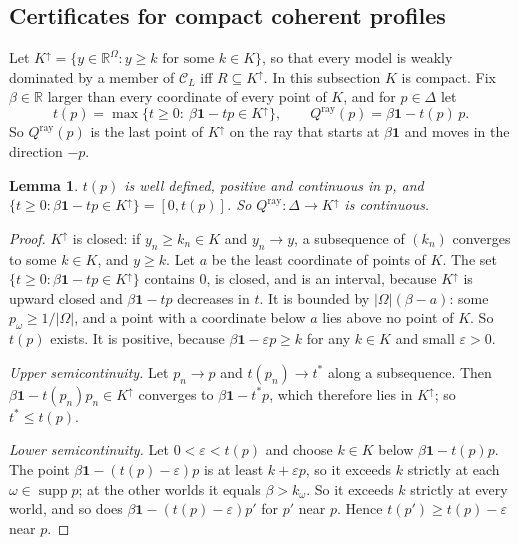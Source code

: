 \documentclass[11pt]{article}
\newtheorem{lemma}[theorem]{Lemma}
\theoremstyle{definition}
\theoremstyle{remark}
\newcommand{\R}{\mathbb R}
\newcommand{\C}{\mathcal C}
\newcommand{\one}{\mathbf 1}
\newcommand{\supp}{\operatorname{supp}}
\begin{document}
\subsection{Certificates for compact coherent profiles}\label{sec:necessary}
Let $K^\uparrow=\{y\in\R^\Omega:y\ge k\text{ for some }k\in K\}$, so that every model is weakly dominated by a member of $\C_L$ iff $R\subseteq K^\uparrow$. In this subsection $K$ is compact. Fix $\beta\in\R$ larger than every coordinate of every point of $K$, and for $p\in\Delta$ let
\[
 t(p)=\max\{t\ge0:\ \beta\one-tp\in K^\uparrow\},\qquad Q^{\mathrm{ray}}(p)=\beta\one-t(p)\,p.
\]
So $Q^{\mathrm{ray}}(p)$ is the last point of $K^\uparrow$ on the ray that starts at $\beta\one$ and moves in the direction $-p$.

\begin{lemma}\label{lem:ray}
$t(p)$ is well defined, positive and continuous in $p$, and $\{t\ge0:\beta\one-tp\in K^\uparrow\}=[0,t(p)]$. So $Q^{\mathrm{ray}}:\Delta\to K^\uparrow$ is continuous.
\end{lemma}
\begin{proof}
$K^\uparrow$ is closed: if $y_n\ge k_n\in K$ and $y_n\to y$, a subsequence of $(k_n)$ converges to some $k\in K$, and $y\ge k$. Let $a$ be the least coordinate of points of $K$. The set $\{t\ge0:\beta\one-tp\in K^\uparrow\}$ contains $0$, is closed, and is an interval, because $K^\uparrow$ is upward closed and $\beta\one-tp$ decreases in $t$. It is bounded by $|\Omega|(\beta-a)$: some $p_\omega\ge1/|\Omega|$, and a point with a coordinate below $a$ lies above no point of $K$. So $t(p)$ exists. It is positive, because $\beta\one-\varepsilon p\ge k$ for any $k\in K$ and small $\varepsilon>0$.

\emph{Upper semicontinuity.} Let $p_n\to p$ and $t(p_n)\to t^*$ along a subsequence. Then $\beta\one-t(p_n)p_n\in K^\uparrow$ converges to $\beta\one-t^*p$, which therefore lies in $K^\uparrow$; so $t^*\le t(p)$.

\emph{Lower semicontinuity.} Let $0<\varepsilon<t(p)$ and choose $k\in K$ below $\beta\one-t(p)p$. The point $\beta\one-(t(p)-\varepsilon)p$ is at least $k+\varepsilon p$, so it exceeds $k$ strictly at each $\omega\in\supp p$; at the other worlds it equals $\beta>k_\omega$. So it exceeds $k$ strictly at every world, and so does $\beta\one-(t(p)-\varepsilon)p'$ for $p'$ near $p$. Hence $t(p')\ge t(p)-\varepsilon$ near $p$.
\end{proof}
\end{document}

